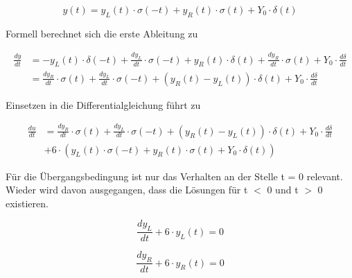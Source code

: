 \begin{equation}\label{eq:threehundredtwentysix}
y\left(t\right)=y_{L} \left(t\right)\cdot \sigma \left(-t\right)+y_{R} \left(t\right)\cdot \sigma \left(t\right)+Y_{0} \cdot \delta \left(t\right)
\end{equation}

\noindent Formell berechnet sich die erste Ableitung zu

\begin{equation}\label{eq:threehundredtwentyseven}
\begin{split}
\frac{dy}{dt}  & = -y_{L} \left(t\right)\cdot \delta \left(-t\right)+\frac{dy_{L} }{dt} \cdot \sigma \left(-t\right)+y_{R} \left(t\right)\cdot \delta \left(t\right)+\frac{dy_{R} }{dt} \cdot \sigma \left(t\right)+Y_{0} \cdot \frac{d\delta }{dt}\\ 
& = \frac{dy_{R} }{dt} \cdot \sigma \left(t\right)+\frac{dy_{L} }{dt} \cdot \sigma \left(-t\right)+\left(y_{R} \left(t\right)-y_{L} \left(t\right)\right)\cdot \delta \left(t\right)+Y_{0} \cdot \frac{d\delta }{dt}
\end{split}
\end{equation}

\noindent Einsetzen in die Differentialgleichung f\"{u}hrt zu

\begin{equation}\label{eq:threehundredtwentyeight}
\begin{split}
\frac{du}{dt} & = \frac{dy_{R} }{dt} \cdot \sigma \left(t\right)+\frac{dy_{L} }{dt} \cdot \sigma \left(-t\right)+\left(y_{R} \left(t\right)-y_{L} \left(t\right)\right)\cdot \delta \left(t\right)+Y_{0} \cdot \frac{d\delta }{dt}\\ 
& +6\cdot \left(y_{L} \left(t\right)\cdot \sigma \left(-t\right)+y_{R} \left(t\right)\cdot \sigma \left(t\right)+Y_{0} \cdot \delta \left(t\right)\right)
\end{split}
\end{equation}

\noindent F\"{u}r die \"{U}bergangsbedingung ist nur das Verhalten an der Stelle t = 0 relevant. Wieder wird davon ausgegangen, dass die L\"{o}sungen f\"{u}r t $\mathrm{<}$ 0 und t $\mathrm{>}$ 0 existieren. 

\begin{equation}\label{eq:threehundredtwentynine}
\frac{dy_{L} }{dt} +6\cdot y_{L} \left(t\right)=0
\end{equation}

\begin{equation}\label{eq:threehundredthirty}
\frac{dy_{R} }{dt} +6\cdot y_{R} \left(t\right)=0
\end{equation}

